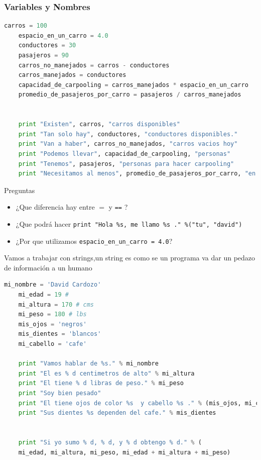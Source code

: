 \documentclass[]{beamer}
\begin{document}
\begin{frame}
	\frametitle{Variables y Nombres}
	\begin{lstlisting}[language=Python,inputencoding=utf8, 
	basicstyle=\ttfamily\small, 
	keywordstyle=\color{keywords},
	commentstyle=\color{comments},
	stringstyle=\color{red},
	showstringspaces=false,
	identifierstyle=\color{green},caption= Problema de Wheels Uniandes, basicstyle=\tiny]
	carros = 100
	espacio_en_un_carro = 4.0
	conductores = 30
	pasajeros = 90
	carros_no_manejados = carros - conductores
	carros_manejados = conductores
	capacidad_de_carpooling = carros_manejados * espacio_en_un_carro
	promedio_de_pasajeros_por_carro = pasajeros / carros_manejados
	
	
	print "Existen", carros, "carros disponibles"
	print "Tan solo hay", conductores, "conductores disponibles."
	print "Van a haber", carros_no_manejados, "carros vacios hoy"
	print "Podemos llevar", capacidad_de_carpooling, "personas"
	print "Tenemos", pasajeros, "personas para hacer carpooling"
	print "Necesitamos al menos", promedio_de_pasajeros_por_carro, "en cada carro"
	\end{lstlisting}
	
	\begin{block}{Preguntas}
		\begin{itemize}
			\item ¿Que diferencia hay entre $ = $ y \verb|==| ?
			\item ¿Que podrá hacer \verb|print "Hola %s, me llamo %s ." %("tu", "david")|
			\item ¿Por que utilizamos \verb|espacio_en_un_carro = 4.0|?
		\end{itemize}
	\end{block}
\end{frame}
\begin{frame}
	Vamos a trabajar con \alert{strings},un string es como se un programa va dar un pedazo de información a un humano
	\begin{lstlisting}[language=Python, 
	basicstyle=\ttfamily\small, 
	keywordstyle=\color{keywords},
	commentstyle=\color{comments},
	stringstyle=\color{red},
	showstringspaces=false,
	identifierstyle=\color{green},caption= Problema de Wheels Uniandes, basicstyle=\tiny]
	mi_nombre = 'David Cardozo'
	mi_edad = 19 #
	mi_altura = 170 # cms
	mi_peso = 180 # lbs
	mis_ojos = 'negros'
	mis_dientes = 'blancos'
	mi_cabello = 'cafe'
	
	print "Vamos hablar de %s." % mi_nombre
	print "El es % d centimetros de alto" % mi_altura
	print "El tiene % d libras de peso." % mi_peso
	print "Soy bien pesado"
	print "El tiene ojos de color %s  y cabello %s ." % (mis_ojos, mi_cabello)
	print "Sus dientes %s dependen del cafe." % mis_dientes
	

	print "Si yo sumo % d, % d, y % d obtengo % d." % (
	mi_edad, mi_altura, mi_peso, mi_edad + mi_altura + mi_peso)
	\end{lstlisting}
\end{frame}
\end{document}
